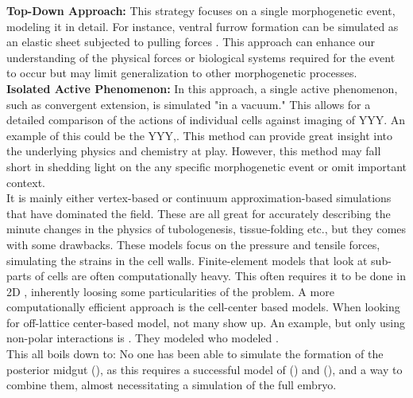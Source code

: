 \textbf{Top-Down Approach:} This strategy focuses on a single morphogenetic event, modeling it in detail. For instance, ventral furrow formation can be simulated as an elastic sheet subjected to pulling forces . This approach can enhance our understanding of the physical forces or biological systems required for the event to occur but may limit generalization to other morphogenetic processes.\\

\textbf{Isolated Active Phenomenon:} In this approach, a single active phenomenon, such as convergent extension, is simulated "in a vacuum." This allows for a detailed comparison of the actions of individual cells against imaging of YYY. An example of this could be the YYY,.  This method can provide great insight into the underlying physics and chemistry at play. However, this method may fall short in shedding light on the any specific morphogenetic event or omit important context.\\

It is mainly either vertex-based or continuum approximation-based simulations that have dominated the field. These are all great for accurately describing the minute changes in the physics of tubologenesis, tissue-folding etc., but they comes with some drawbacks. These  models focus on the pressure and tensile forces, simulating the strains in the cell walls. Finite-element models that look at sub-parts of cells are often computationally heavy. This often requires it to be done in 2D \cite{krajnc2018fluidization}, inherently loosing some particularities of the problem. A more computationally efficient approach is the cell-center based models. When looking for off-lattice center-based model, not many show up. An example, but only using non-polar interactions is . They modeled who modeled .\\

This all boils down to: No one has been able to simulate the formation of the posterior midgut (), as this requires a successful model of () and (), and a way to combine them, almost necessitating a simulation of the full embryo.



% 



